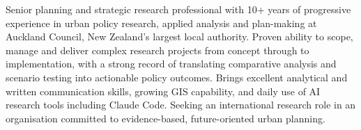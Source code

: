 \documentclass[11pt,a4paper,sans]{moderncv}
\begin{document}
\makecvtitle


\vspace{6pt}
\small{Senior planning and strategic research professional with 10+ years of progressive experience in urban policy research, applied analysis and plan-making at Auckland Council, New Zealand's largest local authority. Proven ability to scope, manage and deliver complex research projects from concept through to implementation, with a strong record of translating comparative analysis and scenario testing into actionable policy outcomes. Brings excellent analytical and written communication skills, growing GIS capability, and daily use of AI research tools including Claude Code. Seeking an international research role in an organisation committed to evidence-based, future-oriented urban planning.}

\end{document}
